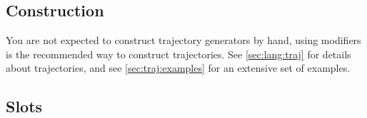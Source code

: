\let\subsubsection\subsubsectionOrig

\subsection{Construction}

You are not expected to construct trajectory generators by hand, using
modifiers is the recommended way to construct trajectories.  See
\autoref{sec:lang:traj} for details about trajectories, and see
\autoref{sec:traj:examples} for an extensive set of examples.

\subsection{Slots}


